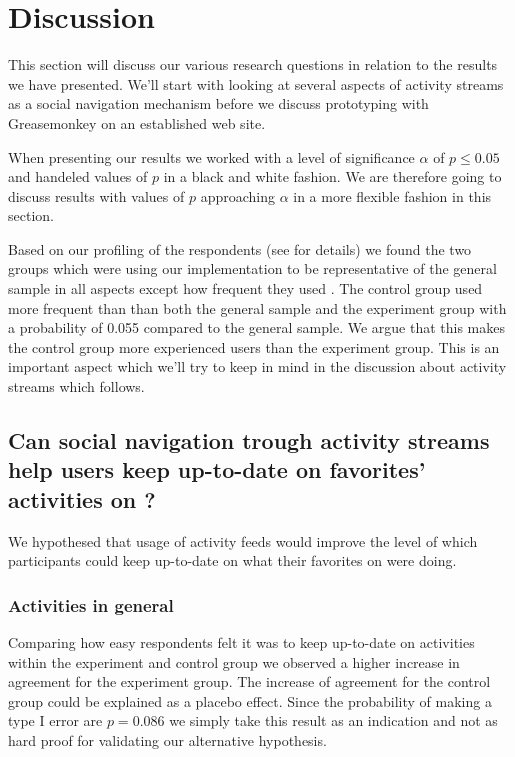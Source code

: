 \section{Discussion}

This section will discuss our various research questions in relation
to the results we have presented. We'll start with looking at
several aspects of activity streams as a social navigation
mechanism before we discuss prototyping with Greasemonkey on
an established web site.

When presenting our results we worked with a level of significance
$\alpha$ of $p \leq 0.05$%
and handeled values of $p$ in a black and white fashion.
We are therefore going to discuss results with values of $p$ approaching
$\alpha$ in a more flexible fashion in this section.

Based on our profiling of the respondents (see 
 for details)
we found the two groups which were using our implementation to be
representative of the general sample in all aspects except how
frequent they used \urort{}. The control group used \urort{} more
frequent than than both the general sample and the experiment group
with a probability of 0.055 compared to the general sample.
We argue that this makes the control group more experienced
\urort{} users than the experiment group.
This is an important aspect which we'll try to keep in mind in
the discussion about activity streams which follows.

\subsection{%
  Can social navigation trough activity streams help users keep
  up-to-date on favorites' activities on \urort{}?
}

We hypothesed that usage of activity feeds would improve the level
of which participants could keep up-to-date on what their favorites
on \urort{} were doing.

\subsubsection{Activities in general}

Comparing how easy respondents felt it was to keep up-to-date on activities
within the experiment and control group%
we observed a higher increase in agreement for the experiment group. The
increase of agreement for the control group could be explained as
a placebo effect.
Since the probability of making a type I error are
$p = 0.086$ we simply take this result as an indication and not as hard proof
for validating our alternative hypothesis.

